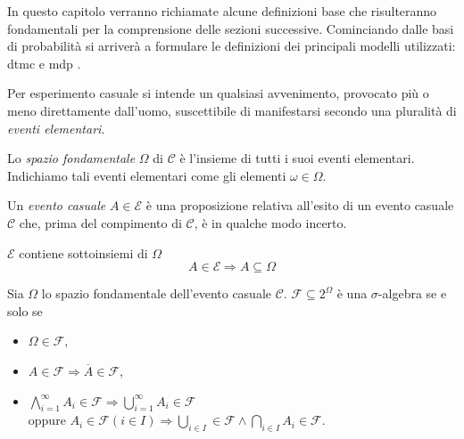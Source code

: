 In questo capitolo verranno richiamate alcune definizioni base che risulteranno fondamentali per la comprensione delle sezioni successive. Cominciando dalle basi di probabilità \cite{B12} si arriverà a formulare le definizioni dei principali modelli utilizzati: \acf{dtmc} e \acf{mdp} \cite{KNP11}.

\begin{mtdef}
	Per esperimento casuale si intende un qualsiasi avvenimento, provocato più o meno direttamente dall'uomo, suscettibile di manifestarsi secondo una pluralità di \emph{eventi elementari}.
\end{mtdef}

\begin{mtdef}
	Lo \emph{spazio fondamentale} $\Omega$ di $\mathcal{C}$ è l'insieme di tutti i suoi eventi elementari. Indichiamo tali eventi elementari come gli elementi $\omega \in \Omega$.
\end{mtdef}

\begin{mtdef}
	Un \emph{evento casuale} $A \in \mathcal{E}$ è una proposizione relativa all'esito di un evento casuale $\mathcal{C}$ che, prima del compimento di $\mathcal{C}$, è in qualche modo incerto.
\end{mtdef}

\begin{mtobs}
	$\mathcal{E}$ contiene sottoinsiemi di $\Omega$
	$$ A \in \mathcal{E} \Rightarrow A \subseteq \Omega $$
\end{mtobs}

\begin{mtdef}
	Sia $\Omega$ lo spazio fondamentale dell'evento casuale $\mathcal{C}$. $\mathcal{F} \subseteq 2^\Omega$ è una $\sigma$-algebra se e solo se
	\begin{itemize}
		\item $\Omega \in \mathcal{F}$,
		\item $A \in \mathcal{F} \Rightarrow \overline{A} \in \mathcal{F}$,
		\item $\bigwedge_{i=1}^{\infty} A_i \in \mathcal{F} \Rightarrow \bigcup_{i=1}^\infty A_i \in \mathcal{F}$ \\ oppure $A_i \in \mathcal{F} (i \in I) \Rightarrow \bigcup_{i \in I} \in \mathcal{F} \wedge \bigcap_{i \in I} A_i \in \mathcal{F}$.
	\end{itemize}
\end{mtdef}

